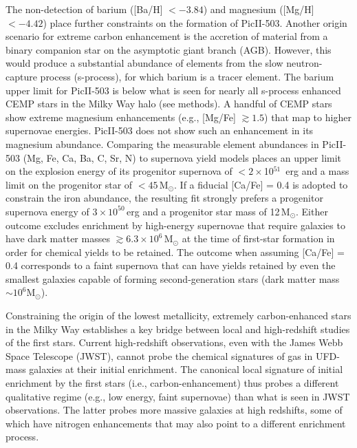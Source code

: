 \documentclass[pdflatex,sn-nature]{sn-jnl}%
\theoremstyle{thmstyleone}%
\theoremstyle{thmstyletwo}%
\theoremstyle{thmstylethree}%
\begin{document}
The non-detection of barium ([Ba/H] $< -3.84$) and magnesium ([Mg/H] $< -4.42$) place further constraints on the formation of PicII-503. 
Another origin scenario for extreme carbon enhancement is the accretion of material from a binary companion star on the asymptotic giant branch (AGB)\cite{ran+05}.
However, this would produce a substantial abundance of elements from the slow neutron-capture process (s-process), for which barium is a tracer element.
The barium upper limit for PicII-503 is below what is seen for nearly all s-process enhanced CEMP stars in the Milky Way halo (see methods)\cite{af+18}.
A handful of CEMP stars show extreme magnesium enhancements (e.g., [Mg/Fe] $\gtrsim 1.5$\cite{anr+02, kbf+14}) that map to higher supernovae energies\cite{iut+05,hw+10}.
PicII-503 does not show such an enhancement in its magnesium abundance.
Comparing the measurable element abundances in PicII-503 (Mg, Fe, Ca, Ba, C, Sr, N) to supernova yield models\cite{hw+10} places an upper limit on the explosion energy of its progenitor supernova of $< 2\times$10$^{51}$ \,erg and a mass limit on the progenitor star of $<45$\,M$_\odot$. 
If a fiducial [Ca/Fe] = 0.4\cite{ww+95,fn+15} is adopted to constrain the iron abundance, the resulting fit strongly prefers a progenitor supernova energy of $3\times10^{50}$\,erg and a progenitor star mass of 12\,M$_\odot$.
Either outcome excludes enrichment by high-energy supernovae that require galaxies to have dark matter masses $\gtrsim6.3\times10^6$\,M$_\odot$ at the time of first-star formation in order for chemical yields to be retained\cite{cm+14}. 
The outcome when assuming [Ca/Fe] = 0.4 corresponds to a faint supernova that can have yields retained by even the smallest galaxies capable of forming second-generation stars (dark matter mass $\sim10^6$M$_\odot$).

Constraining the origin of the lowest metallicity, extremely carbon-enhanced stars in the Milky Way establishes a key bridge between local and high-redshift studies of the first stars. 
Current high-redshift observations, even with the James Webb Space Telescope (JWST), cannot probe the chemical signatures of gas in UFD-mass galaxies at their initial enrichment\cite{nmk+24}. 
The canonical local signature of initial enrichment by the first stars (i.e., carbon-enhancement) thus probes a different qualitative regime (e.g., low energy, faint supernovae) than what is seen in JWST observations.
The latter probes more massive galaxies at high redshifts, some of which have nitrogen enhancements\cite{bsc+23, ckr+23} that may also point to a different  enrichment process. 
\end{document}
